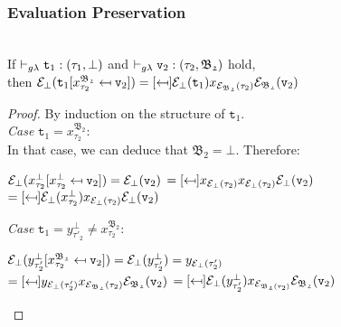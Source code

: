 \subsubsection{Evaluation Preservation}
\begin{lemma} ~\\
	If $\vdash_{g\lambda} \texttt{t}_{1} : (\tau_{1}, \bot)$  
	and \mbox{$\vdash_{g\lambda} \texttt{v}_{2} : (\tau_{2}, \mathfrak{B_{2}})$}	
	hold, \\ then
	$\e_{\bot}
	(\sbst
		{\texttt{t}_{1}}
		{x^{\mathfrak{B_{2}}}_{\tau_{2}}}
		{\texttt{v}_{2}})
	= \sbst
			{\e_{\bot}(\texttt{t}_{1})}
			{x_{\e_{\mathfrak{B_{2}}}(\tau_{2})}}
			{\e_{\mathfrak{B_{2}}}(\texttt{v}_{2})}$
\label{Substitution under erasure}
\end{lemma}
\begin{proof}
By induction on the structure of $\texttt{t}_{1}$.  \\

\noindent\textit{Case} 
$
\texttt{t}_{1} = x^{\mathfrak{B_{2}}}_{\tau_{2}}$:\\
In that case,  we can deduce that $\mathfrak{B_{2}} = \bot$. Therefore:

\begin{center}
 $\mathcal{E}_{\bot}
	(x^{\bot}_{\tau_{2}} [x^{\bot}_{\tau_{2}} \mapsfrom \texttt{v}_{2}]) 
	= \mathcal{E}_{\bot}(\texttt{v}_{2}) $ 
	$= \sbst
			{x_{\e_{\bot}(\tau_{2})}}
			{x_{\e_{\bot}(\tau_{2})}}
			{\e_{\bot}(\texttt{v}_{2})}$ \\[0.08cm]
	$= \sbst
			{\e_{\bot}(x^{\bot}_{\tau_{2}})}
			{x_{\e_{\bot}(\tau_{2})}}
			{\e_{\bot}(\texttt{v}_{2})}$
\end{center}

\noindent\textit{Case} $
\texttt{t}_{1} = y^{\bot}_{\tau'_{2}} 
\neq x^{\mathfrak{B_{2}}}_{\tau_{2}}$:
\begin{center}
 $\mathcal{E}_{\bot}
	(y^{\bot}_{\tau'_{2}} [x^{\mathfrak{B_{2}}}_{\tau_{2}} \mapsfrom \texttt{v}_{2}]) 
	= \mathcal{E}_{\bot}(y^{\bot}_{\tau'_{2}}) 
	= y_{\mathcal{E}_{\bot}(\tau'_{2})} $ \\[0.08cm]
	$  = \sbst
			{y_{\e_{\bot}(\tau'_{2})}}
			{x_{\e_{\mathfrak{B_{2}}}(\tau_{2})}}
			{\e_{\mathfrak{B_{2}}}(\texttt{v}_{2})}$ 
	$= \sbst
			{\e_{\bot}(y^{\bot}_{\tau'_{2}})}
			{x_{\e_{\mathfrak{B_{2}}(\tau_{2})}}}
			{\e_{\mathfrak{B_{2}}}(\texttt{v}_{2})}$
\end{center}


\end{proof}
